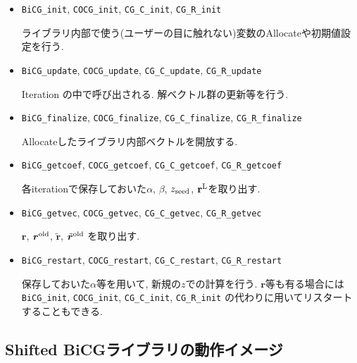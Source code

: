 \documentclass[12pt,titlepage]{jarticle}
\begin{document}
\begin{itemize}
\item \verb|BiCG_init|, \verb|COCG_init|, \verb|CG_C_init|, \verb|CG_R_init|

ライブラリ内部で使う(ユーザーの目に触れない)変数のAllocateや初期値設定を行う.

\item \verb|BiCG_update|, \verb|COCG_update|, \verb|CG_C_update|, \verb|CG_R_update|

Iteration の中で呼び出される. 解ベクトル群の更新等を行う.


\item \verb|BiCG_finalize|, \verb|COCG_finalize|, \verb|CG_C_finalize|, \verb|CG_R_finalize|

Allocateしたライブラリ内部ベクトルを開放する.

\item \verb|BiCG_getcoef|, \verb|COCG_getcoef|, \verb|CG_C_getcoef|, \verb|CG_R_getcoef|

各iterationで保存しておいた$\alpha$, $\beta$, $z_{\rm seed}$, ${\bf r}^{\rm L}$を取り出す.

\item \verb|BiCG_getvec|, \verb|COCG_getvec|, \verb|CG_C_getvec|, \verb|CG_R_getvec|

${\boldsymbol r}$, ${\boldsymbol r}^{\rm old}$, 
${\tilde {\boldsymbol r}}$, ${\tilde {\boldsymbol r}}^{\rm old}$
を取り出す.

\item \verb|BiCG_restart|, \verb|COCG_restart|, \verb|CG_C_restart|, \verb|CG_R_restart|

保存しておいた$\alpha$等を用いて, 新規の$z$での計算を行う.
${\boldsymbol r}$等も有る場合には
\verb|BiCG_init|, \verb|COCG_init|, \verb|CG_C_init|, \verb|CG_R_init|
の代わりに用いてリスタートすることもできる.

\end{itemize}

\subsection{Shifted BiCGライブラリの動作イメージ}%
\end{document}
